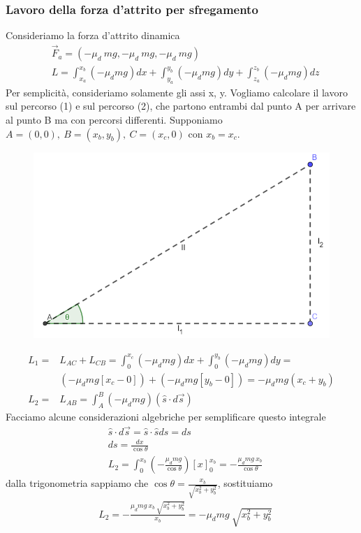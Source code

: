 \documentclass[10pt,a4paper]{article}
\begin{document}
\subsubsection{Lavoro della forza d'attrito per sfregamento}
Consideriamo la forza d'attrito dinamica 
\begin{align*}
	&\vec{F}_a = (-\mu_d\ mg,-\mu_d\ mg,-\mu_d\ mg)\\ 
	&L =  \int_{x_a}^{x_b}(-\mu_d mg) dx +\int_{y_a}^{y_b}(-\mu_d mg) dy+\int_{z_a}^{z_b}(-\mu_d mg) dz
\end{align*}
Per semplicità, consideriamo solamente gli assi x, y. Vogliamo calcolare il lavoro sul percorso (1) e sul percorso (2), che partono entrambi dal punto A per arrivare al punto B ma con percorsi differenti. Supponiamo $A = (0,0),\ B = (x_b,y_b),\ C= (x_c,0)$ con $x_b = x_c$.
\begin{figure}[h]
	\centering
	\includegraphics[width=0.5\linewidth]{"Screenshot 2021-11-12 015249"}
	\label{fig:screenshot-2021-11-12-015249}
\end{figure}
\begin{align*}
L_1 =& L_{AC}+L_{CB} = \int_{0}^{x_c} (-\mu_d mg) dx + \int_{0}^{y_b} (-\mu_d mg) dy=\\
&(-\mu_d mg [x_c-0])+(-\mu_d mg [y_b-0]) = -\mu_d mg(x_c+y_b)\\
L_2 =& L_{AB} = \int_{A}^{B}(-\mu_d mg) (\hat{s} \cdot d\vec{s}) 
\end{align*}
Facciamo alcune considerazioni algebriche per semplificare questo integrale
\begin{align*}
&\hat{s}\cdot d\vec{s}= \hat{s}\cdot \hat{s} ds = ds\\
& ds =\frac{dx}{\cos\theta}\\
&L_2 = \int_{0}^{x_b}(-\frac{\mu_d mg}{\cos\theta}) [x]_{0}^{x_b}=-\frac{\mu_d mg\ x_b}{\cos\theta}
\end{align*}
dalla trigonometria sappiamo che $\cos\theta= \frac{x_b}{\sqrt{x_b^2+y_b^2}}$, sostituiamo
\begin{align*}
&L_2 = -\frac{\mu_d mg\ x_b\ \sqrt{x_b^2+y_b^2}}{x_b} = -\mu_d mg\ \sqrt{x_b^2+y_b^2} 
\end{align*}
\end{document}
